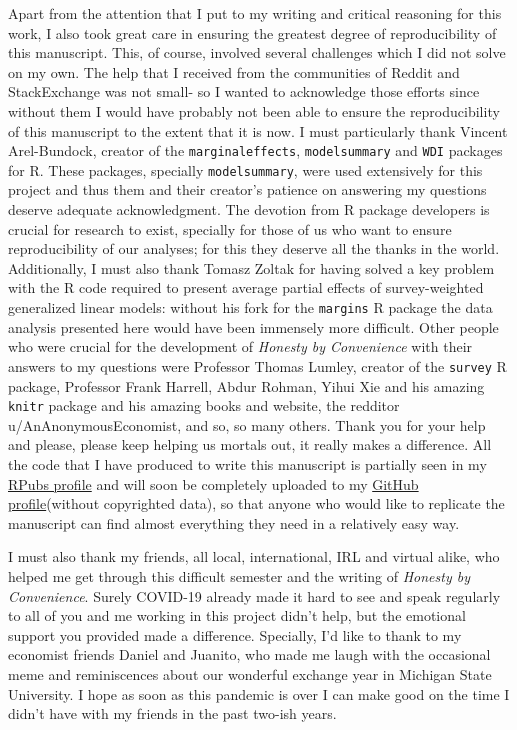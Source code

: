 \documentclass[floatsintext,man]{apa7}\usepackage[]{graphicx}\usepackage[]{color}
\begin{document}
Apart from the attention that I put to my writing and critical reasoning for this work, I also took great care in ensuring the greatest degree of reproducibility of this manuscript. This, of course, involved several challenges which I did not solve on my own. The help that I received from the communities of Reddit and StackExchange was not small- so I wanted to acknowledge those efforts since without them I would have probably not been able to ensure the reproducibility of this manuscript to the extent that it is now. I must particularly thank Vincent Arel-Bundock, creator of the \texttt{marginaleffects}, \texttt{modelsummary} and \texttt{WDI} packages for R. These packages, specially \texttt{modelsummary}, were used extensively for this project and thus them and their creator's patience on answering my questions deserve adequate acknowledgment. The devotion from R package developers is crucial for research to exist, specially for those of us who want to ensure reproducibility of our analyses; for this they deserve all the thanks in the world. Additionally, I must also thank Tomasz Zoltak for having solved a key problem with the R code required to present average partial effects of survey-weighted generalized linear models: without his fork for the \texttt{margins} R package the data analysis presented here would have been immensely more difficult. Other people who were crucial for the development of \textit{Honesty by Convenience} with their answers to my questions were Professor Thomas Lumley, creator of the \texttt{survey} R package, Professor Frank Harrell, Abdur Rohman, Yihui Xie and his amazing \texttt{knitr} package and his amazing books and website, the redditor u/AnAnonymousEconomist, and so, so many others. Thank you for your help and please, please keep helping us mortals out, it really makes a difference. All the code that I have produced to write this manuscript is partially seen in my \href{https://rpubs.com/dsanchezp998}{RPubs profile} and will soon be completely uploaded to my \href{https://github.com/dsanchezp18}{GitHub profile}(without copyrighted data), so that anyone who would like to replicate the manuscript can find almost everything they need in a relatively easy way. 

I must also thank my friends, all local, international, IRL and virtual alike, who helped me get through this difficult semester and the writing of \textit{Honesty by Convenience}.  Surely COVID-19 already made it hard to see and speak regularly to all of you and me working in this project didn't help, but the emotional support you provided made a difference. Specially, I'd like to thank to my economist friends Daniel and Juanito, who made me laugh with the occasional meme and reminiscences about our wonderful exchange year in Michigan State University. I hope as soon as this pandemic is over I can make good on the time I didn't have with my friends in the past two-ish years. 
\end{document}
